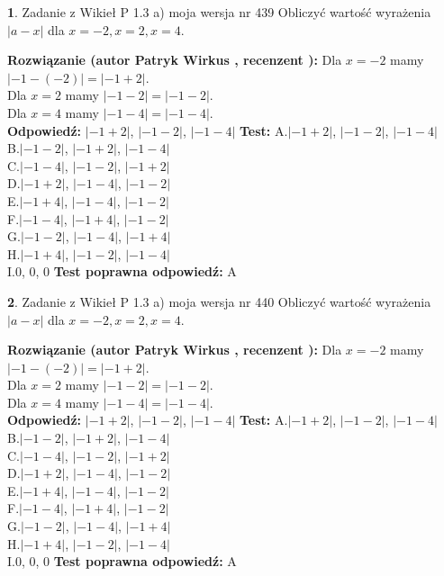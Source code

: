 \documentclass[12pt, a4paper]{article}
\theoremstyle{definition} %
\newtheorem{zad}{}
\newcommand{\zadStart}[1]{\begin{zad}#1\newline}
\newcommand{\zadStop}{\end{zad}}
\newcommand{\rozwStart}[2]{\noindent \textbf{Rozwiązanie (autor #1 , recenzent #2): }\newline}
\newcommand{\rozwStop}{\newline}
\newcommand{\odpStart}{\noindent \textbf{Odpowiedź:}\newline}
\newcommand{\odpStop}{\newline}
\newcommand{\testStart}{\noindent \textbf{Test:}\newline}
\newcommand{\testStop}{\newline}
\newcommand{\kluczStart}{\noindent \textbf{Test poprawna odpowiedź:}\newline}
\newcommand{\kluczStop}{\newline}
\begin{document}
\zadStart{Zadanie z Wikieł P 1.3 a) moja wersja nr 439}
Obliczyć wartość wyrażenia $|a - x|$ dla $x=-2,x=2,x=4$.
\zadStop
\rozwStart{Patryk Wirkus}{}
Dla $x = -2$ mamy $|-1 - (-2)| = |-1 + 2|$.\\
Dla $x = 2$ mamy $|-1 - 2| = |-1 - 2|$.\\
Dla $x = 4$ mamy $|-1 - 4| = |-1 - 4|$.\\
\rozwStop
\odpStart
$|-1 + 2|$, $|-1 - 2|$, $|-1 - 4|$
\odpStop
\testStart
A.$|-1 + 2|$, $|-1 - 2|$, $|-1 - 4|$\\
B.$|-1 - 2|$, $|-1 + 2|$, $|-1 - 4|$\\
C.$|-1 - 4|$, $|-1 - 2|$, $|-1 + 2|$\\
D.$|-1 + 2|$, $|-1 - 4|$, $|-1 - 2|$\\
E.$|-1 + 4|$, $|-1 - 4|$, $|-1 - 2|$\\
F.$|-1 - 4|$, $|-1 + 4|$, $|-1 - 2|$\\
G.$|-1 - 2|$, $|-1 - 4|$, $|-1 + 4|$\\
H.$|-1 + 4|$, $|-1 - 2|$, $|-1 - 4|$\\
I.$0$, $0$, $0$
\testStop
\kluczStart
A
\kluczStop



\zadStart{Zadanie z Wikieł P 1.3 a) moja wersja nr 440}
Obliczyć wartość wyrażenia $|a - x|$ dla $x=-2,x=2,x=4$.
\zadStop
\rozwStart{Patryk Wirkus}{}
Dla $x = -2$ mamy $|-1 - (-2)| = |-1 + 2|$.\\
Dla $x = 2$ mamy $|-1 - 2| = |-1 - 2|$.\\
Dla $x = 4$ mamy $|-1 - 4| = |-1 - 4|$.\\
\rozwStop
\odpStart
$|-1 + 2|$, $|-1 - 2|$, $|-1 - 4|$
\odpStop
\testStart
A.$|-1 + 2|$, $|-1 - 2|$, $|-1 - 4|$\\
B.$|-1 - 2|$, $|-1 + 2|$, $|-1 - 4|$\\
C.$|-1 - 4|$, $|-1 - 2|$, $|-1 + 2|$\\
D.$|-1 + 2|$, $|-1 - 4|$, $|-1 - 2|$\\
E.$|-1 + 4|$, $|-1 - 4|$, $|-1 - 2|$\\
F.$|-1 - 4|$, $|-1 + 4|$, $|-1 - 2|$\\
G.$|-1 - 2|$, $|-1 - 4|$, $|-1 + 4|$\\
H.$|-1 + 4|$, $|-1 - 2|$, $|-1 - 4|$\\
I.$0$, $0$, $0$
\testStop
\kluczStart
A
\kluczStop
\end{document}

